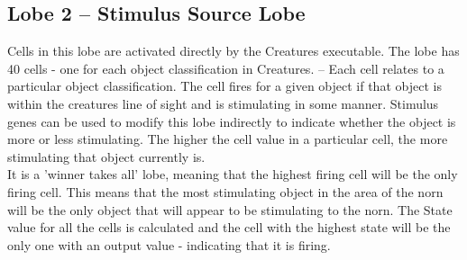 \documentclass[11pt,twoside,a4paper]{article}
\begin{document}
\subsection{Lobe 2 -- Stimulus Source Lobe}

Cells in this lobe are activated directly by the Creatures executable. The lobe has 40 cells - one for each object classification in Creatures. -- Each cell relates to a particular object classification. The cell fires for a given object if that object is within the creatures line of sight and is stimulating in some manner. Stimulus genes can be used to modify this lobe indirectly to indicate whether the object is more or less stimulating. The higher the cell value in a particular cell, the more stimulating that object currently is.~\\

It is a 'winner takes all' lobe, meaning that the highest firing cell will be the only firing cell. This means that the most stimulating object in the area of the norn will be the only object that will appear to be stimulating to the norn. The State value for all the cells is calculated and the cell with the highest state will be the only one with an output value - indicating that it is firing.~\\


\end{document}
